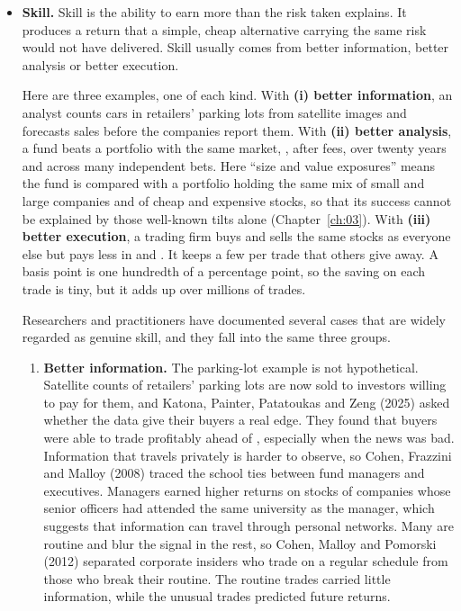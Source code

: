 \begin{itemize}
  \item \textbf{Skill.} Skill is the ability to earn more than the risk taken
  explains. It produces a return that a simple, cheap alternative carrying the
  same risk would not have delivered. Skill usually comes from better
  information, better analysis or better execution.

  Here are three examples, one of each kind. 
  With \textbf{(i) better
  information}, an analyst counts cars in retailers' parking lots from
  satellite images and forecasts sales before the companies report them.
  With \textbf{(ii) better analysis}, a fund beats a portfolio with the same
  market, , after fees, over twenty years and across
  many independent bets. Here ``size and value exposures'' means the fund is
  compared with a portfolio holding the same mix of small and large companies
  and of cheap and expensive stocks, so that its success cannot be explained
  by those well-known tilts alone (Chapter~\ref{ch:03}).
  With \textbf{(iii) better execution}, a trading firm
  buys and sells the same stocks as everyone else but pays less in  and . It keeps a few  per trade that others
  give away. A basis point is one hundredth of a percentage point, so the
  saving on each trade is tiny, but it adds up over millions of trades.

  
  Researchers and practitioners have documented several cases that are widely
  regarded as genuine skill, and they fall into the same three groups.
  
  \begin{enumerate}
    \item \textbf{Better information.} The parking-lot example is not hypothetical.
  Satellite counts of retailers' parking lots are now sold to investors
  willing to pay for them, and Katona, Painter, Patatoukas and Zeng (2025)
  asked whether the data give their buyers a real edge. They found that
  buyers were able to trade profitably ahead of ,
  especially when the news was bad. Information that travels privately is
  harder to observe, so Cohen, Frazzini and Malloy (2008) traced the school
  ties between fund managers and executives. Managers earned higher returns
  on stocks of companies whose senior officers had attended the same
  university as the manager, which suggests that information can travel
  through personal networks. Many  are routine and blur the
  signal in the rest, so Cohen, Malloy and Pomorski (2012) separated
  corporate insiders who trade on a regular schedule from those who break
  their routine. The routine trades carried little information, while the
  unusual trades predicted future returns.


\end{enumerate}
\end{itemize}
